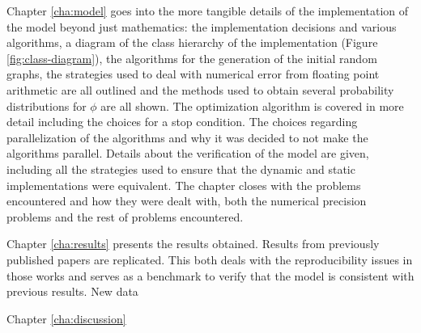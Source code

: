 Chapter \ref{cha:model} goes into the more tangible details of the implementation of the model beyond just mathematics: the implementation decisions and various algorithms, a diagram of the class hierarchy of the implementation (Figure \ref{fig:class-diagram}), the algorithms for the generation of the initial random graphs, the strategies used to deal with numerical error from floating point arithmetic are all outlined and the methods used to obtain several probability distributions for $\phi$ are all shown.
The optimization algorithm is covered in more detail including the choices for a stop condition.
The choices regarding parallelization of the algorithms and why it was decided to not make the algorithms parallel.
Details about the verification of the model are given, including all the strategies used to ensure that the dynamic and static implementations were equivalent.
The chapter closes with the problems encountered and how they were dealt with, both the numerical precision problems and the rest of problems encountered.

Chapter \ref{cha:results} presents the results obtained.
Results from previously published papers \cite{Ferrer2005a} \cite{Ferrer2003a} are replicated.
This both deals with the reproducibility issues in those works and serves as a benchmark to verify that the model is consistent with previous results.
New data

Chapter \ref{cha:discussion}

